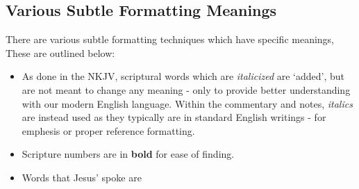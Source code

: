 \subsection*{Various Subtle Formatting Meanings}

There are various subtle formatting techniques which have specific meanings, These are outlined below:
\begin{itemize}
	\item As done in the NKJV, scriptural words which are \textit{italicized} are `added', but are not meant to change any meaning - only to provide better understanding with our modern English language. Within the commentary and notes, \textit{italics} are instead used as they typically are in standard English writings - for emphesis or proper reference formatting.
	\item Scripture numbers are in \textbf{bold} for ease of finding.
	\item Words that Jesus' spoke are 
\end{itemize}
